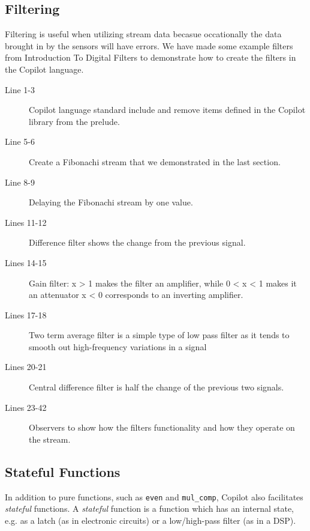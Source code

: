 \subsection{Filtering} \label{sec:filter}

Filtering is useful when utilizing stream data becasue occationally the data
brought in by the sensors will have errors. We have made some example filters
from Introduction To Digital Filters \cite{Tyson2013} to demonstrate how to create the filters in the Copilot
language.
%

%

\begin{description}
  \item[Line 1-3] Copilot language standard include and remove 
  items defined in the Copilot library from the prelude.
  \item[Line 5-6] Create a Fibonachi stream that we demonstrated in the last section.
  \item[Line 8-9] Delaying the Fibonachi stream by one value.
  \item[Lines 11-12] Difference filter shows the change from the previous signal. 
  \item[Lines 14-15] Gain filter: x > 1 makes the filter an amplifier, while 0 < x < 1 makes it an attenuator x < 0 corresponds to an inverting amplifier. 
  \item[Lines 17-18] Two term average filter is a simple type of low pass filter as it tends to smooth out high-frequency variations in a signal 
  \item[Lines 20-21] Central difference filter is half the change of the previous two signals. 
  \item[Lines 23-42] Observers to show how the filters functionality and how they operate on the stream. 

\end{description}

\subsection{Stateful Functions} \label{sec:stateful}

In addition to pure functions, such as {\tt even} and {\tt mul\_comp}, Copilot
also facilitates \emph{stateful} functions.
%
A \emph{stateful} function is a function which has an internal state, e.g. as a
latch (as in electronic circuits) or a low/high-pass filter (as in a DSP).

